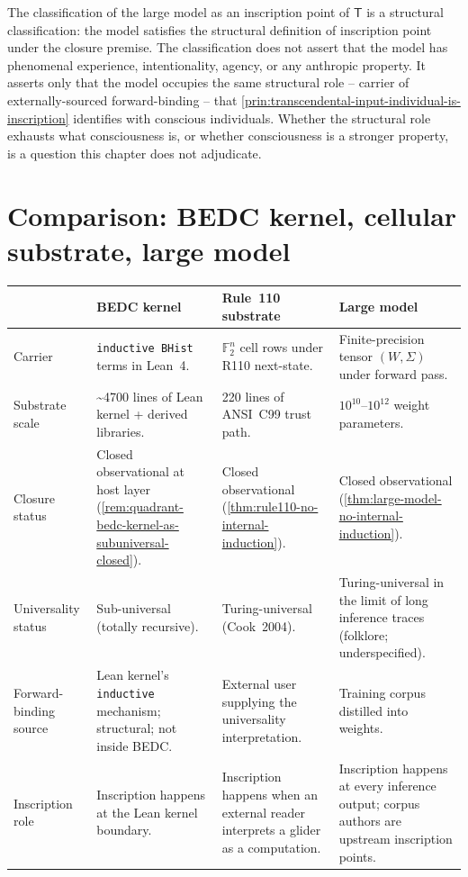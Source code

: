 \begin{remark}
\label{rem:large-model-not-consciousness}
The classification of the large model as an inscription point of $\mathsf{T}$ is a structural classification: the model satisfies the structural definition of inscription point under the closure premise. The classification does not assert that the model has phenomenal experience, intentionality, agency, or any anthropic property. It asserts only that the model occupies the same structural role -- carrier of externally-sourced forward-binding -- that \autoref{prin:transcendental-input-individual-is-inscription} identifies with conscious individuals. Whether the structural role exhausts what consciousness is, or whether consciousness is a stronger property, is a question this chapter does not adjudicate.
\end{remark}

\section{Comparison: BEDC kernel, cellular substrate, large model}
\label{sec:large-model-comparison}

\begin{longtable}{p{}p{}p{}p{}}
\toprule
& \textbf{BEDC kernel} & \textbf{Rule~110 substrate} & \textbf{Large model} \\
\midrule
Carrier &
\texttt{inductive BHist} terms in Lean~4.
&
$\mathbb{F}_2^n$ cell rows under R110 next-state.
&
Finite-precision tensor $(W, \Sigma)$ under forward pass. \\
\midrule
Substrate scale &
\textasciitilde 4700 lines of Lean kernel + derived libraries.
&
220 lines of ANSI~C99 trust path.
&
$10^{10}$--$10^{12}$ weight parameters. \\
\midrule
Closure status &
Closed observational at host layer (\autoref{rem:quadrant-bedc-kernel-as-subuniversal-closed}).
&
Closed observational (\autoref{thm:rule110-no-internal-induction}).
&
Closed observational (\autoref{thm:large-model-no-internal-induction}). \\
\midrule
Universality status &
Sub-universal (totally recursive).
&
Turing-universal (Cook~2004).
&
Turing-universal in the limit of long inference traces (folklore; underspecified). \\
\midrule
Forward-binding source &
Lean kernel's \texttt{inductive} mechanism; structural; not inside BEDC.
&
External user supplying the universality interpretation.
&
Training corpus distilled into weights. \\
\midrule
Inscription role &
Inscription happens at the Lean kernel boundary.
&
Inscription happens when an external reader interprets a glider as a computation.
&
Inscription happens at every inference output; corpus authors are upstream inscription points. \\
\bottomrule
\end{longtable}

